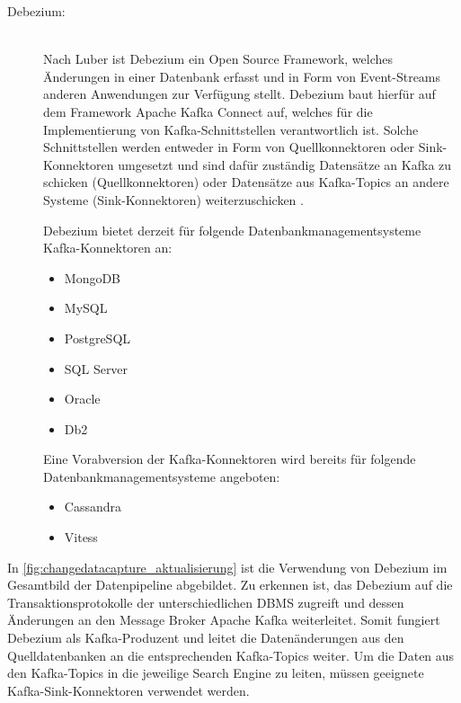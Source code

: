 \begin{description}
\item[Debezium:]\hfill \\
    Nach Luber \cite{StefanLuber.2021} ist Debezium ein Open Source Framework, welches Änderungen in einer Datenbank erfasst und in Form von Event-Streams anderen Anwendungen zur Verfügung stellt. Debezium baut hierfür auf dem Framework \glqq Apache Kafka Connect\grqq{} auf, welches für die Implementierung von Kafka-Schnittstellen verantwortlich ist. Solche Schnittstellen werden entweder in Form von Quellkonnektoren oder Sink-Konnektoren umgesetzt und sind dafür zuständig Datensätze an Kafka zu schicken (Quellkonnektoren) oder Datensätze aus Kafka-Topics an andere Systeme (Sink-Konnektoren) weiterzuschicken \cite{DebeziumCommunity.2021b}.
    
    Debezium bietet derzeit für folgende Datenbankmanagementsysteme Kafka-Konnektoren an: \cite{DebeziumCommunity.2021}

    \begin{itemize}
        \item MongoDB
        \item MySQL
        \item PostgreSQL
        \item SQL Server
        \item Oracle
        \item Db2
    \end{itemize}

    Eine Vorabversion der Kafka-Konnektoren wird bereits für folgende Datenbankmanagementsysteme angeboten: \cite{DebeziumCommunity.2021}

    \begin{itemize}
        \item Cassandra
        \item Vitess
    \end{itemize}


\end{description}

In \autoref{fig:changedatacapture_aktualisierung} ist die Verwendung von Debezium im Gesamtbild der Datenpipeline abgebildet. Zu erkennen ist, das Debezium auf die Transaktionsprotokolle der unterschiedlichen DBMS zugreift und dessen Änderungen an den Message Broker Apache Kafka weiterleitet. Somit fungiert Debezium als Kafka-Produzent und leitet die Datenänderungen aus den Quelldatenbanken an die entsprechenden Kafka-Topics weiter. Um die Daten aus den Kafka-Topics in die jeweilige Search Engine zu leiten, müssen geeignete Kafka-Sink-Konnektoren verwendet werden.

